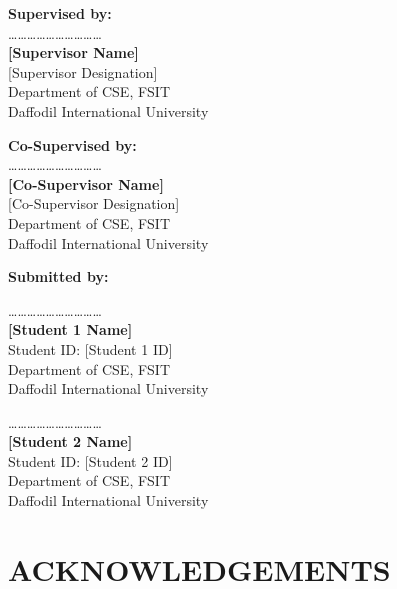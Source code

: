 \vspace{1.5cm}
\begin{minipage}{0.48\textwidth}
\textbf{Supervised by:}\\[0.5cm]
\dots\dots\dots\dots\dots\dots\dots\dots\dots\dots\\
{\textbf{[Supervisor Name]}}\\[0.05cm]
{[Supervisor Designation]}\\[0.05cm]
Department of CSE, FSIT\\
Daffodil International University
\end{minipage}
\hfill
\begin{minipage}{0.48\textwidth}
\textbf{Co-Supervised by:}\\[0.5cm]
\dots\dots\dots\dots\dots\dots\dots\dots\dots\dots\\
{\textbf{[Co-Supervisor Name]}}\\[0.05cm]
{[Co-Supervisor Designation]}\\[0.05cm]
Department of CSE, FSIT\\
Daffodil International University
\end{minipage}

\vspace{2cm}
\noindent\textbf{Submitted by:}

\vspace{1cm}
\begin{minipage}{0.48\textwidth}
\dots\dots\dots\dots\dots\dots\dots\dots\dots\dots\\
{\textbf{[Student 1 Name]}}\\[0.05cm]
Student ID: [Student 1 ID] \\
Department of CSE, FSIT\\
Daffodil International University
\end{minipage}
\hfill
\begin{minipage}{0.48\textwidth}
\dots\dots\dots\dots\dots\dots\dots\dots\dots\dots\\
{\textbf{[Student 2 Name]}}\\[0.05cm]
Student ID: [Student 2 ID]\\
Department of CSE, FSIT\\
Daffodil International University
\end{minipage}

\cleardoublepage
\section*{ACKNOWLEDGEMENTS}

